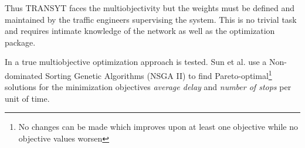 Thus TRANSYT faces the multiobjectivity but the weights must be defined and maintained by the traffic engineers supervising the system. This is no trivial task and requires intimate knowledge of the network as well as the optimization package.

In \cite{41} a true multiobjective optimization approach is tested. Sun et al. use a Non-dominated Sorting Genetic Algorithms (NSGA II) to find Pareto-optimal\footnote{No changes can be made which improves upon at least one objective while no objective values worsen} solutions for the minimization objectives \textit{average delay} and \textit{number of stops} per unit of time. 

